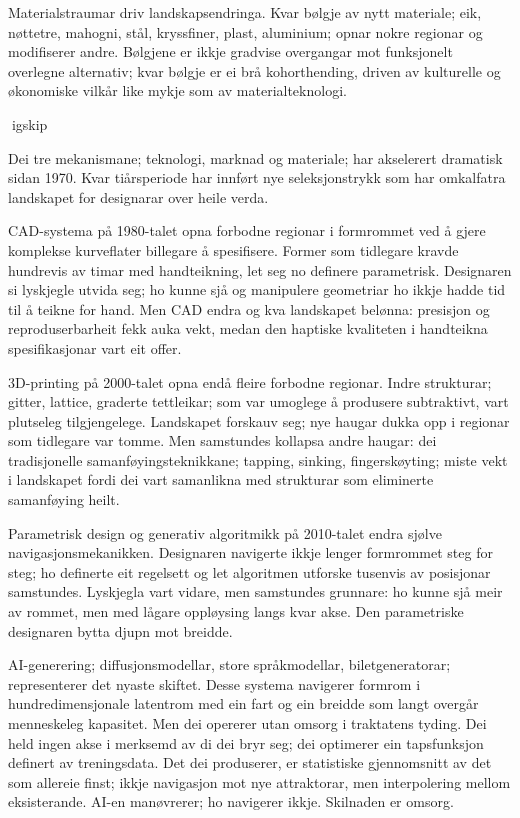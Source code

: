 Materialstraumar driv landskapsendringa. Kvar bølgje av nytt materiale; eik, nøttetre, mahogni, stål, kryssfiner, plast, aluminium; opnar nokre regionar og modifiserer andre. Bølgjene er ikkje gradvise overgangar mot funksjonelt overlegne alternativ; kvar bølgje er ei brå kohorthending, driven av kulturelle og økonomiske vilkår like mykje som av materialteknologi.

igskip

Dei tre mekanismane; teknologi, marknad og materiale; har akselerert dramatisk sidan 1970. Kvar tiårsperiode har innført nye seleksjonstrykk som har omkalfatra landskapet for designarar over heile verda.

CAD-systema på 1980-talet opna forbodne regionar i formrommet ved å gjere komplekse kurveflater billegare å spesifisere. Former som tidlegare kravde hundrevis av timar med handteikning, let seg no definere parametrisk. Designaren si lyskjegle utvida seg; ho kunne sjå og manipulere geometriar ho ikkje hadde tid til å teikne for hand. Men CAD endra og kva landskapet belønna: presisjon og reproduserbarheit fekk auka vekt, medan den haptiske kvaliteten i handteikna spesifikasjonar vart eit offer.

3D-printing på 2000-talet opna endå fleire forbodne regionar. Indre strukturar; gitter, lattice, graderte tettleikar; som var umoglege å produsere subtraktivt, vart plutseleg tilgjengelege. Landskapet forskauv seg; nye haugar dukka opp i regionar som tidlegare var tomme. Men samstundes kollapsa andre haugar: dei tradisjonelle samanføyingsteknikkane; tapping, sinking, fingerskøyting; miste vekt i landskapet fordi dei vart samanlikna med strukturar som eliminerte samanføying heilt.

Parametrisk design og generativ algoritmikk på 2010-talet endra sjølve navigasjonsmekanikken. Designaren navigerte ikkje lenger formrommet steg for steg; ho definerte eit regelsett og let algoritmen utforske tusenvis av posisjonar samstundes. Lyskjegla vart vidare, men samstundes grunnare: ho kunne sjå meir av rommet, men med lågare oppløysing langs kvar akse. Den parametriske designaren bytta djupn mot breidde.

AI-generering; diffusjonsmodellar, store språkmodellar, biletgeneratorar; representerer det nyaste skiftet. Desse systema navigerer formrom i hundredimensjonale latentrom med ein fart og ein breidde som langt overgår menneskeleg kapasitet. Men dei opererer utan omsorg i traktatens tyding. Dei held ingen akse i merksemd av di dei bryr seg; dei optimerer ein tapsfunksjon definert av treningsdata. Det dei produserer, er statistiske gjennomsnitt av det som allereie finst; ikkje navigasjon mot nye attraktorar, men interpolering mellom eksisterande. AI-en manøvrerer; ho navigerer ikkje. Skilnaden er omsorg.

